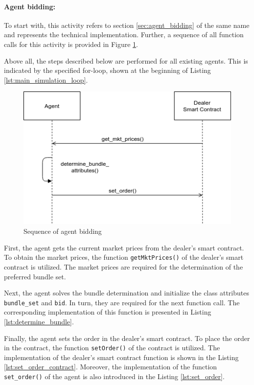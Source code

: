 \paragraph{Agent bidding:}
To start with, this activity refers to section \ref{sec:agent_bidding} of the same name and represents
the technical implementation. Further, a sequence of all function 
calls for this activity is provided in Figure \ref{figure:agent_bidding_figure}.

Above all, the steps described below are performed for all existing agents. 
This is indicated by the specified for-loop, shown at the beginning of Listing \ref{lst:main_simulation_loop}.

\begin{figure}[htbp]
	\centering
	\includegraphics[width=.8\linewidth]{./figures/agent_bidding.png}
	\caption{Sequence of agent bidding}
	\label{figure:agent_bidding_figure}
\end{figure}

First, the agent gets the current market prices from the dealer's smart contract.
To obtain the market prices, the function \verb|getMktPrices()| of the dealer's smart contract is utilized.
The market prices are required for the determination of the preferred bundle set.

Next, the agent solves the bundle determination and initialize the class attributes
\verb|bundle_set| and \verb|bid|.
In turn, they are required for the next function call.
The corresponding implementation of this function is presented in Listing \ref{lst:determine_bundle}.

Finally, the agent sets the order in the dealer's smart contract.
To place the order in the contract, the function \verb|setOrder()| of the contract is utilized.
The implementation of the dealer's smart contract function is shown in the Listing \ref{lst:set_order_contract}.
Moreover, the implementation of the function \verb|set_order()| of the agent is 
also introduced in the Listing \ref{lst:set_order}.

